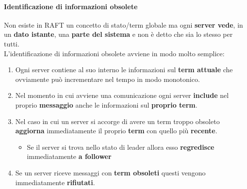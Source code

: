     \paragraph{Identificazione di informazioni obsolete}
    Non esiste in RAFT un concetto di stato/term globale ma ogni \textbf{server vede}, in un \textbf{dato istante}, una \textbf{parte del sistema} e non è detto che sia lo stesso per tutti.\\
    L'identificazione di informazioni obsolete avviene in modo molto semplice:
    \begin{enumerate}
      \item Ogni server contiene al suo interno le informazioni sul \textbf{term attuale} che ovviamente può incrementare nel tempo in modo monotonico.
      \item Nel momento in cui avviene una comunicazione ogni server \textbf{include} nel proprio \textbf{messaggio} anche le informazioni sul \textbf{proprio term}.
      \item Nel caso in cui un server si accorge di avere un term troppo obsoleto \textbf{aggiorna} immediatamente il proprio \textbf{term} con quello più \textbf{recente}.
      \begin{itemize}
        \item Se il server si trova nello stato di leader allora esso \textbf{regredisce} immediatamente \textbf{a follower}
      \end{itemize}
      \item Se un server riceve messaggi con \textbf{term obsoleti} questi vengono immediatamente \textbf{rifiutati}.
    \end{enumerate}

  



